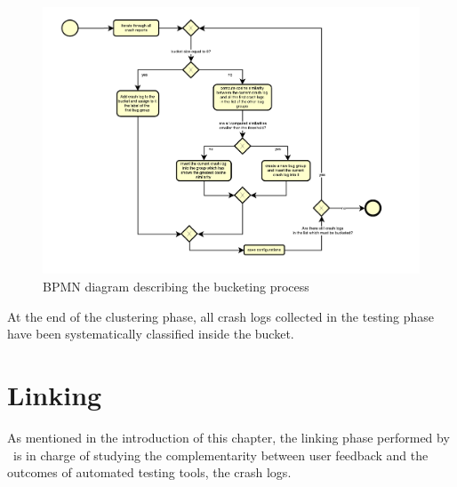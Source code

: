 \begin{figure}[tb]
\centering 
\includegraphics[width=\columnwidth]{diagrams/bucketingprocess.pdf} 
\caption{BPMN diagram describing the bucketing process}
\label{bucketing}
\end{figure}

At the end of the clustering phase, all crash logs collected in the testing phase have been systematically classified inside the bucket. 


\clearpage
\section{Linking}
As mentioned in the introduction of this chapter, the linking phase performed by \toolname\ is in charge of studying the complementarity between user feedback and the outcomes of automated testing tools, \ie the crash logs. 


